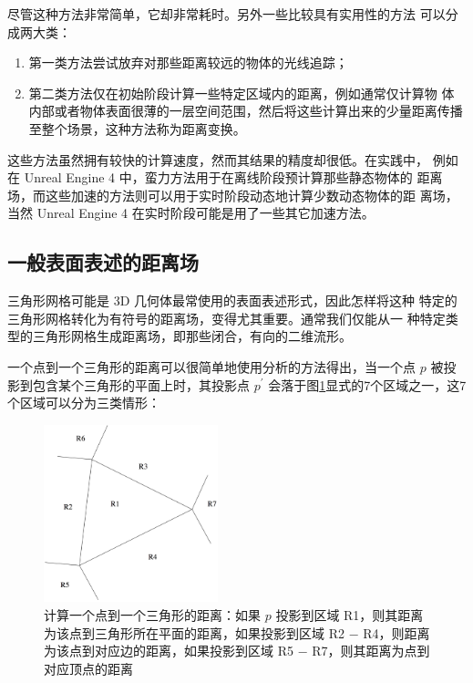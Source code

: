 尽管这种方法非常简单，它却非常耗时。另外一些比较具有实用性的方法 可以分成两大类：

\begin{enumerate}
	\item 第一类方法尝试放弃对那些距离较远的物体的光线追踪；
	\item 第二类方法仅在初始阶段计算一些特定区域内的距离，例如通常仅计算物 体内部或者物体表面很薄的一层空间范围，然后将这些计算出来的少量距离传播至整个场景，这种方法称为距离变换。
\end{enumerate}

这些方法虽然拥有较快的计算速度，然而其结果的精度却很低。在实践中， 例如在 Unreal Engine 4 中，蛮力方法用于在离线阶段预计算那些静态物体的 距离场，而这些加速的方法则可以用于实时阶段动态地计算少数动态物体的距 离场，当然 Unreal Engine 4 在实时阶段可能是用了一些其它加速方法。



\subsection{一般表面表述的距离场}
三角形网格可能是 3D 几何体最常使用的表面表述形式，因此怎样将这种 特定的三角形网格转化为有符号的距离场，变得尤其重要。通常我们仅能从一 种特定类型的三角形网格生成距离场，即那些闭合，有向的二维流形。

一个点到一个三角形的距离可以很简单地使用分析的方法得出，当一个点 $p$ 被投影到包含某个三角形的平面上时，其投影点 $p^{'}$ 会落于图\ref{f:df-calculating-distance-to-triangle}显式的7个区域之一，这7个区域可以分为三类情形\cite{a:3d-distance-fields-a-survey}：

\begin{figure}
	\sidecaption
	\includegraphics[width=0.45\textwidth]{figures/df/calculating-distance-to-triangle}
	\caption{计算一个点到一个三角形的距离：如果 $p$ 投影到区域 R1，则其距离为该点到三角形所在平面的距离，如果投影到区域 R2 − R4，则距离为该点到对应边的距离，如果投影到区域 R5 − R7，则其距离为点到对应顶点的距离}
	\label{f:df-calculating-distance-to-triangle}
\end{figure}

